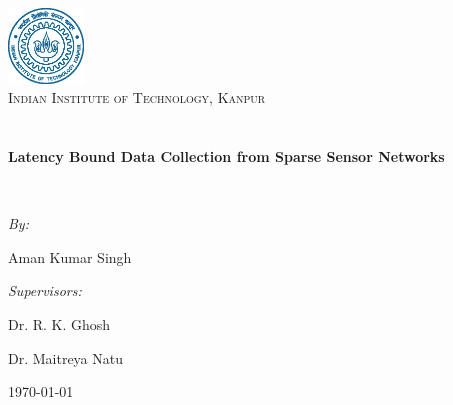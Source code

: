\begin{titlepage}
\begin{center}

\includegraphics[width=0.15\textwidth]{./logo}~\\[1cm]

\textsc{\LARGE Indian Institute of Technology, Kanpur}\\[1.5cm]

\textsc{\Large }\\[0.5cm]

\HRule \\[0.4cm]
{ \huge \bfseries Latency Bound Data Collection from Sparse Sensor Networks \\[0.4cm] }

\HRule \\[1.5cm]

\begin{minipage}{0.4\textwidth}
\begin{flushleft} \large
\emph{By:}

Aman Kumar Singh
\end{flushleft}
\end{minipage}
\begin{minipage}{0.4\textwidth}
\begin{flushright} \large
\emph{Supervisors:}

Dr. R. K. Ghosh

Dr. Maitreya Natu
\end{flushright}
\end{minipage}

\vfill

{\large \today}

\end{center}
\end{titlepage}